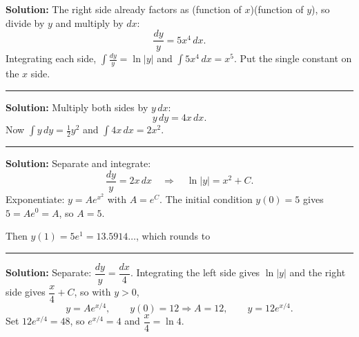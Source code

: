 \documentclass[12pt]{article}
\begin{document}



\textbf{Solution:} The right side already factors as (function of $x$)(function of $y$), so divide by $y$ and multiply by $dx$:
\[ \frac{dy}{y} = 5x^4\,dx. \]
Integrating each side, $\displaystyle\int \frac{dy}{y} = \ln|y|$ and $\displaystyle\int 5x^4\,dx = x^5$. Put the single constant on the $x$ side. 

\vspace{0.2cm}\noindent\rule{\linewidth}{0.2pt}\vspace{0.2cm}


\textbf{Solution:} Multiply both sides by $y\,dx$:
\[ y\,dy = 4x\,dx. \]
Now $\displaystyle\int y\,dy = \tfrac{1}{2}y^2$ and $\displaystyle\int 4x\,dx = 2x^2$. 

\vspace{0.2cm}\noindent\rule{\linewidth}{0.2pt}\vspace{0.2cm}


\textbf{Solution:} Separate and integrate:
\[ \frac{dy}{y} = 2x\,dx \quad\Longrightarrow\quad \ln|y| = x^2 + C. \]
Exponentiate: $y = Ae^{x^2}$ with $A = e^{C}$. The initial condition $y(0) = 5$ gives $5 = Ae^{0} = A$, so $A = 5$. 

Then $y(1) = 5e^{1} = 13.5914\ldots$, which rounds to 

\vspace{0.2cm}\noindent\rule{\linewidth}{0.2pt}\vspace{0.2cm}


\textbf{Solution:} Separate: $\dfrac{dy}{y} = \dfrac{dx}{4}$. Integrating the left side gives $\ln|y|$ and the right side gives $\dfrac{x}{4} + C$, so with $y > 0$,
\[ y = Ae^{x/4}, \qquad y(0) = 12 \Longrightarrow A = 12, \qquad y = 12e^{x/4}. \]
Set $12e^{x/4} = 48$, so $e^{x/4} = 4$ and $\dfrac{x}{4} = \ln 4$. 
\end{document}
